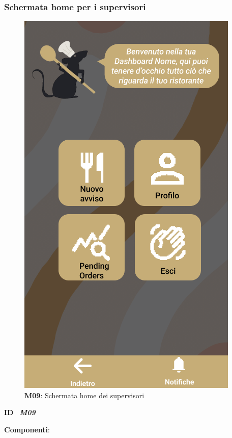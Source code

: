         \subsubsection{Schermata home per i supervisori}
          \begin{figure}[H]
              \centering
              \includegraphics[scale=0.35]{assets/Mockup/Mockup_HypervisorDash.png}
              \caption*{\textbf{M09}: Schermata home dei supervisori}\label{fig:Mockup_HypervisorDash}
          \end{figure}

          \begin{flushleft}
              \textbf{ID}   \ \Large{\textit{\textbf{M09}}}
          \end{flushleft}

          \textbf{Componenti}:

